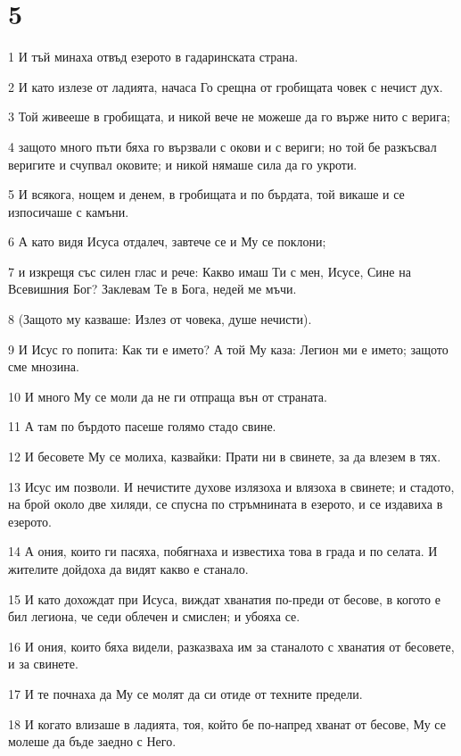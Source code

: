 \chapter{5}

\par 1 И тъй минаха отвъд езерото в гадаринската страна.
\par 2 И като излезе от ладията, начаса Го срещна от гробищата човек с нечист дух.
\par 3 Той живееше в гробищата, и никой вече не можеше да го върже нито с верига;
\par 4 защото много пъти бяха го вързвали с окови и с вериги; но той бе разкъсвал веригите и счупвал оковите; и никой нямаше сила да го укроти.
\par 5 И всякога, нощем и денем, в гробищата и по бърдата, той викаше и се изпосичаше с камъни.
\par 6 А като видя Исуса отдалеч, завтече се и Му се поклони;
\par 7 и изкрещя със силен глас и рече: Какво имаш Ти с мен, Исусе, Сине на Всевишния Бог? Заклевам Те в Бога, недей ме мъчи.
\par 8 (Защото му казваше: Излез от човека, душе нечисти).
\par 9 И Исус го попита: Как ти е името? А той Му каза: Легион ми е името; защото сме мнозина.
\par 10 И много Му се моли да не ги отпраща вън от страната.
\par 11 А там по бърдото пасеше голямо стадо свине.
\par 12 И бесовете Му се молиха, казвайки: Прати ни в свинете, за да влезем в тях.
\par 13 Исус им позволи. И нечистите духове излязоха и влязоха в свинете; и стадото, на брой около две хиляди, се спусна по стръмнината в езерото, и се издавиха в езерото.
\par 14 А ония, които ги пасяха, побягнаха и известиха това в града и по селата. И жителите дойдоха да видят какво е станало.
\par 15 И като дохождат при Исуса, виждат хванатия по-преди от бесове, в когото е бил легиона, че седи облечен и смислен; и убояха се.
\par 16 И ония, които бяха видели, разказваха им за станалото с хванатия от бесовете, и за свинете.
\par 17 И те почнаха да Му се молят да си отиде от техните предели.
\par 18 И когато влизаше в ладията, тоя, който бе по-напред хванат от бесове, Му се молеше да бъде заедно с Него.
